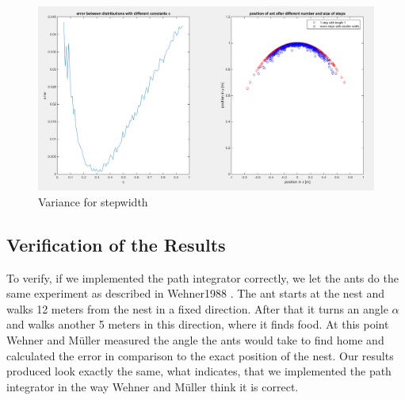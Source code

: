 \documentclass[11pt]{article}
\begin{document}
\begin{figure}[H]
\centering
\includegraphics[scale=0.32]{./Pics/VarianceForStepWidth_plot.png} 
\caption{Variance for stepwidth \label{fig:Variance} }
\end{figure} 


\subsection{Verification of the Results}


To verify, if we implemented the path integrator correctly, we let the ants do the same experiment as described in Wehner1988 \cite{Wehner1988}.
The ant starts at the nest and walks 12 meters from the nest in a fixed direction. After that it turns an angle $\alpha$ and walks another 5 meters in this direction, where it finds food. At this point Wehner and Müller measured the angle the ants would take to find home and calculated the error in comparison to the exact position of the nest.
Our results produced look exactly the same, what indicates, that we implemented the path integrator in the way Wehner and Müller think it is correct.\\
\end{document}

